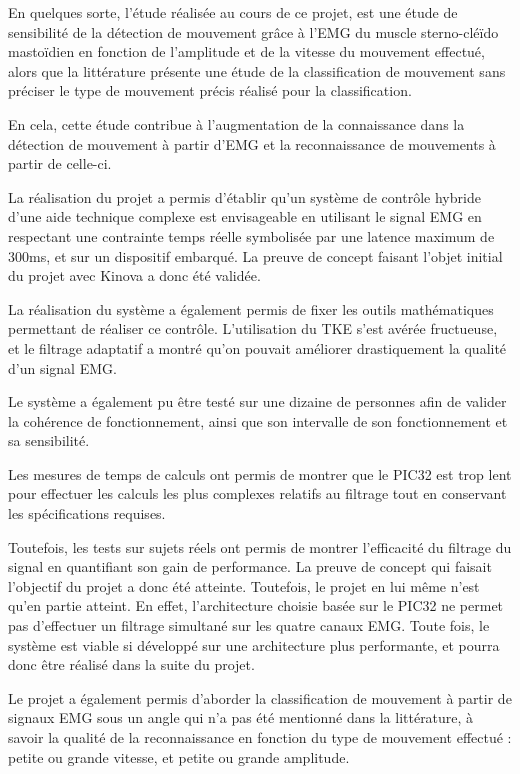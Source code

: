 \documentclass[letterpaper, twoside, 12pt, memoire, creativecommons, hyperref]{thETS}
\begin{document}
En quelques sorte, l'étude réalisée au cours de ce projet, est une étude de sensibilité de la détection de mouvement grâce à l'EMG du muscle sterno-cléïdo mastoïdien en fonction de l'amplitude et de la vitesse du mouvement effectué, alors que la littérature présente une étude de la classification de mouvement sans préciser le type de mouvement précis réalisé pour la classification. 

En cela, cette étude contribue à l'augmentation de la connaissance dans la détection de mouvement à partir d'EMG et la reconnaissance de mouvements à partir de celle-ci.

\begin{conclusion}

La réalisation du projet a permis d'établir qu'un système de contrôle hybride d'une aide technique complexe est envisageable en utilisant le signal EMG en respectant une contrainte temps réelle symbolisée par une latence maximum de 300ms, et sur un dispositif embarqué. La preuve de concept faisant l'objet initial du projet avec Kinova a donc été validée. 

La réalisation du système a également permis de fixer les outils mathématiques permettant de réaliser ce contrôle. L'utilisation du TKE s'est avérée fructueuse, et le filtrage adaptatif a montré qu'on pouvait améliorer drastiquement la qualité d'un signal EMG. 

Le système a également pu être testé sur une dizaine de personnes afin de valider la cohérence de fonctionnement, ainsi que son intervalle de son fonctionnement et sa sensibilité.

Les mesures de temps de calculs ont permis de montrer que le PIC32 est trop lent pour effectuer les calculs les plus complexes relatifs au filtrage tout en conservant les spécifications requises. 

Toutefois, les tests sur sujets réels ont permis de montrer l'efficacité du filtrage du signal en quantifiant son gain de performance. La preuve de concept qui faisait l'objectif du projet a donc été atteinte. Toutefois, le projet en lui même n'est qu'en partie atteint. En effet, l'architecture choisie basée sur le PIC32 ne permet pas d'effectuer un filtrage simultané sur les quatre canaux EMG. Toute fois, le système est viable si développé sur une architecture plus performante, et pourra donc être réalisé dans la suite du projet.

Le projet a également permis d'aborder la classification de mouvement à partir de signaux EMG sous un angle qui n'a pas été mentionné dans la littérature, à savoir la qualité de la reconnaissance en fonction du type de mouvement effectué : petite ou grande vitesse, et petite ou grande amplitude.

\end{conclusion}
\end{document}
